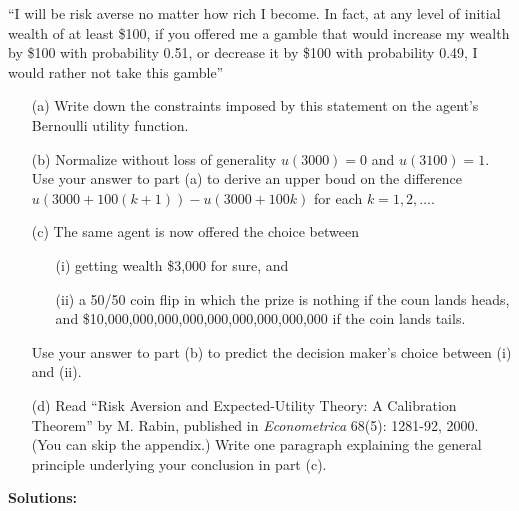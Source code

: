 \documentclass[12pt]{article}
\begin{document}
``I will be risk averse no matter how rich I become. In fact, at any level of initial wealth of at least \$100, if you offered me a gamble that would increase my wealth by \$100 with probability 0.51, or decrease it by \$100 with probability 0.49, I would rather not take this gamble''

\begin{itemize}
    \item[(a)] Write down the constraints imposed by this statement on the agent's Bernoulli utility function.

    \item[(b)] Normalize without loss of generality $u(3000) = 0$ and $u(3100) = 1$. Use your answer to part (a) to derive an upper boud on the difference $u(3000 + 100(k+1)) - u(3000 + 100k)$ for each $k = 1,2,\dots$.

    \item[(c)] The same agent is now offered the choice between
    \begin{itemize}
        \item[(i)] getting wealth \$3,000 for sure, and

        \item[(ii)] a 50/50 coin flip in which the prize is nothing if the coun lands heads, and \$10,000,000,000,000,000,000,000,000,000 if the coin lands tails.
    \end{itemize}
    Use your answer to part (b) to predict the decision maker's choice between (i) and (ii).

    \item[(d)] Read ``Risk Aversion and Expected-Utility Theory: A Calibration Theorem'' by M. Rabin, published in \emph{Econometrica} 68(5): 1281-92, 2000. (You can skip the appendix.) Write one paragraph explaining the general principle underlying your conclusion in part (c).
\end{itemize}
\medskip
\textbf{Solutions:}
\end{document}
